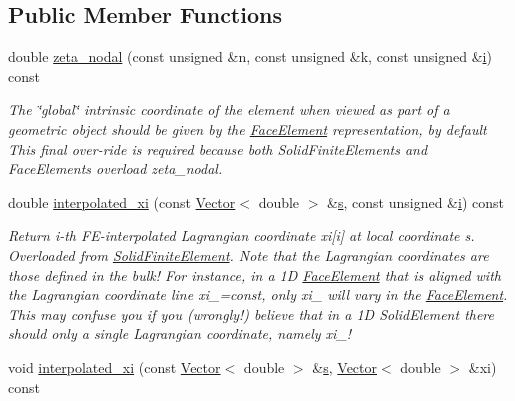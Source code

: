 \subsection*{Public Member Functions}
\begin{DoxyCompactItemize}
\item 
double \hyperlink{classoomph_1_1SolidFaceElement_a28526b0f7a7daa2ab90348e16cf6a529}{zeta\+\_\+nodal} (const unsigned \&n, const unsigned \&k, const unsigned \&\hyperlink{cfortran_8h_adb50e893b86b3e55e751a42eab3cba82}{i}) const
\begin{DoxyCompactList}\small\item\em The \char`\"{}global\char`\"{} intrinsic coordinate of the element when viewed as part of a geometric object should be given by the \hyperlink{classoomph_1_1FaceElement}{Face\+Element} representation, by default This final over-\/ride is required because both Solid\+Finite\+Elements and Face\+Elements overload zeta\+\_\+nodal. \end{DoxyCompactList}\item 
double \hyperlink{classoomph_1_1SolidFaceElement_ace3eb64ce511c869bd140922b6597667}{interpolated\+\_\+xi} (const \hyperlink{classoomph_1_1Vector}{Vector}$<$ double $>$ \&\hyperlink{cfortran_8h_ab7123126e4885ef647dd9c6e3807a21c}{s}, const unsigned \&\hyperlink{cfortran_8h_adb50e893b86b3e55e751a42eab3cba82}{i}) const
\begin{DoxyCompactList}\small\item\em Return i-\/th F\+E-\/interpolated Lagrangian coordinate xi\mbox{[}i\mbox{]} at local coordinate s. Overloaded from \hyperlink{classoomph_1_1SolidFiniteElement}{Solid\+Finite\+Element}. Note that the Lagrangian coordinates are those defined in the bulk! For instance, in a 1D \hyperlink{classoomph_1_1FaceElement}{Face\+Element} that is aligned with the Lagrangian coordinate line xi\+\_=const, only xi\+\_ will vary in the \hyperlink{classoomph_1_1FaceElement}{Face\+Element}. This may confuse you if you (wrongly!) believe that in a 1D Solid\+Element there should only a single Lagrangian coordinate, namely xi\+\_! \end{DoxyCompactList}\item 
void \hyperlink{classoomph_1_1SolidFaceElement_ae1c414e42a48c736a9b634e922dbb314}{interpolated\+\_\+xi} (const \hyperlink{classoomph_1_1Vector}{Vector}$<$ double $>$ \&\hyperlink{cfortran_8h_ab7123126e4885ef647dd9c6e3807a21c}{s}, \hyperlink{classoomph_1_1Vector}{Vector}$<$ double $>$ \&xi) const

\end{DoxyCompactItemize}
